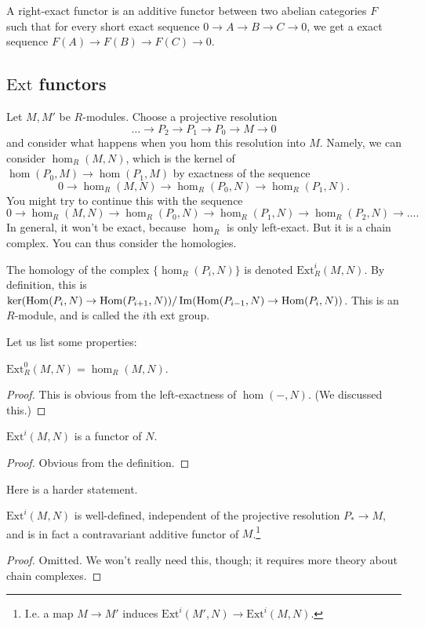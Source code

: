 \begin{definition} A right-exact functor is an additive functor between two abelian categories $F$ such that for every short exact sequence $0\rightarrow A\rightarrow B\rightarrow C\rightarrow 0$, we get a exact sequence $F(A)\rightarrow F(B)\rightarrow F(C)\rightarrow 0$.
\end{definition}


\newcommand{\ext}{\mathrm{Ext}}
\subsection{$\ext$ functors}

Let $M, M'$ be $R$-modules. Choose a projective resolution 
\[ \dots \to P_2 \to P_1 \to P_0 \to M \to 0  \]
and consider what happens when you hom this resolution into $M$. Namely, we can
consider $\hom_R(M,N)$, which is the kernel of $\hom(P_0, M) \to \hom(P_1, M) $
by exactness of the sequence
\[ 0 \to \hom_R(M,N) \to \hom_R(P_0, N) \to \hom_R(P_1, N) . \]
You might try to continue this with the sequence
\[ 0 \to \hom_R(M,N) \to \hom_R(P_0, N) \to \hom_R(P_1, N) \to \hom_R(P_2, N)
\to \dots. \]
In general, it won't be exact, because $\hom_R$ is only left-exact. But it is a
chain complex. You can thus consider the homologies.

\begin{definition} 
The homology of the complex $\{\hom_R(P_i, N)\}$ is denoted $\ext^i_R(M,N)$. By
definition, this is $\ker(\operatorname{Hom}(P_i,N) \to \operatorname{Hom}(P_{i+1}, N))/\operatorname{Im}(\operatorname{Hom}(P_{i-1},
N) \to \operatorname{Hom}(P_i,N))$. This is an $R$-module, and is called the $i$th ext group.
\end{definition} 



Let us list some properties:

\begin{proposition} 
$\ext_R^0(M,N) = \hom_R(M,N)$. 
\end{proposition} 
\begin{proof} 
This is obvious from the left-exactness of $\hom(-,N)$. (We discussed this.)
\end{proof} 

\begin{proposition} 
$\ext^i(M,N)$ is a functor of $N$.
\end{proposition} 
\begin{proof} 
Obvious from the definition.
\end{proof} 

Here is a harder statement.
\begin{proposition} 
$\ext^i(M,N)$ is well-defined, independent of the projective resolution $P_*
\to M$, and is in fact a contravariant additive functor of $M$.\footnote{I.e. a map $M
\to M'$ induces $\ext^i(M', N) \to \ext^i(M,N)$.}
\end{proposition} 
\begin{proof} 
Omitted. We won't really need this, though; it requires more theory about
chain complexes.
\end{proof} 


